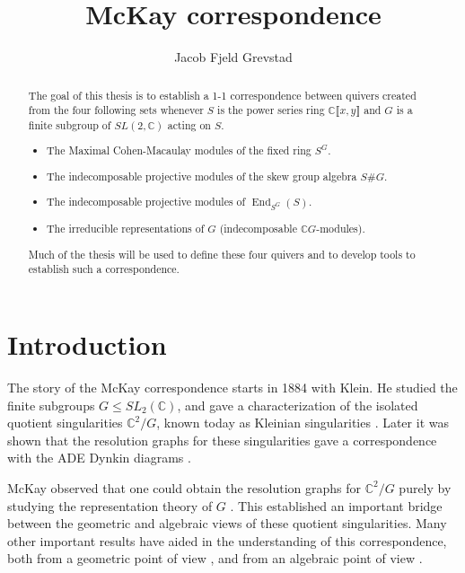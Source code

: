 \documentclass[11pt, a4paper, english]{article}
\theoremstyle{definition}
\newcommand{\C}{\mathbb{C}}
\DeclareMathOperator{\End}{End}
\begin{document}
\title{McKay correspondence}
\author{Jacob Fjeld Grevstad}
\maketitle

\begin{abstract}
The goal of this thesis is to establish a 1-1 correspondence between quivers created from the four following sets whenever $S$ is the power series ring $\C \llbracket x, y \rrbracket$ and $G$ is a finite subgroup of $SL(2,\C)$ acting on $S$.
\begin{itemize}
\item The Maximal Cohen-Macaulay modules of the fixed ring $S^G$.
\item The indecomposable projective modules of the skew group algebra $S\#G$.
\item The indecomposable projective modules of $\End_{S^G}(S)$.
\item The irreducible representations of $G$ (indecomposable $\C G$-modules).
\end{itemize}
Much of the thesis will be used to define these four quivers and to develop tools to establish such a correspondence. %
\end{abstract}

\tableofcontents

\section*{Introduction}
The story of the McKay correspondence starts in 1884 with Klein. He studied the finite subgroups $G \leq SL_2(\C)$, and gave a characterization of the isolated quotient singularities $\C^2/G$, known today as Kleinian singularities \cite{Kle84}. Later it was shown that the resolution graphs for these singularities gave a correspondence with the ADE Dynkin diagrams \cite{DuV34, Art66}.

McKay observed that one could obtain the resolution graphs for $\C^2/G$ purely by studying the representation theory of $G$ \cite{Mck83}. This established an important bridge between the geometric and algebraic views of these quotient singularities. Many other important results have aided in the understanding of this correspondence, both from a geometric point of view \cite{GSV81, AV85, EK85}, and from an algebraic point of view \cite{Aus86, AR89}.
\end{document}
